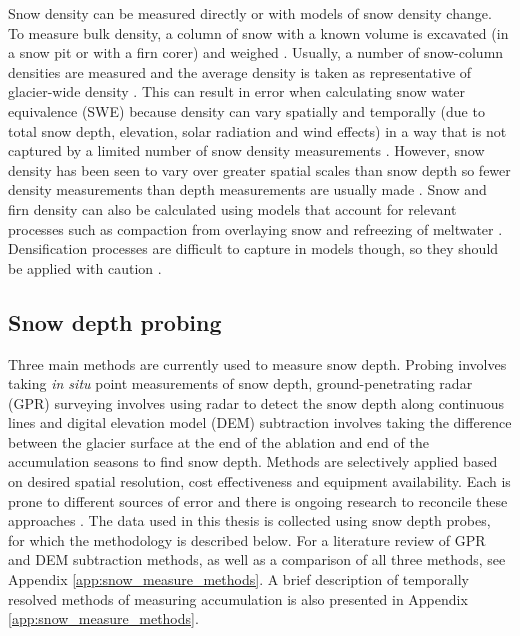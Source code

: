 \documentclass{sfuthesis}
\begin{document}
Snow density can be measured directly or with models of snow density change. To measure bulk density, a column of snow with a known volume is excavated (in a snow pit or with a firn corer) and weighed \citep{Sold2013, Sold2014}. Usually, a number of snow-column densities are measured and the average density is taken as representative of glacier-wide density \citep[e.g.][]{Machguth2006, Grunewald2010, McGrath2015}. This can result in error when calculating snow water equivalence (SWE) because density can vary spatially and temporally (due to total snow depth, elevation, solar radiation and wind effects) in a way that is not captured by a limited number of snow density measurements \citep{Grunewald2010, Wetlaufer2016}. However, snow density has been seen to vary over greater spatial scales than snow depth so fewer density measurements than depth measurements are usually made \citep{Elder1998, Clark2011}. Snow and firn density can also be calculated using models that account for relevant processes such as compaction from overlaying snow and refreezing of meltwater \citep{Herron1980, Sold2014}. Densification processes are difficult to capture in models though, so they should be applied with caution \citep{Mellor1974}.

\subsection{Snow depth probing}

Three main methods are currently used to measure snow depth. Probing involves taking \textit{in situ} point measurements of snow depth, ground-penetrating radar (GPR) surveying involves using radar to detect the snow depth along continuous lines and digital elevation model (DEM) subtraction involves taking the difference between the glacier surface at the end of the ablation and end of the accumulation seasons to find snow depth. Methods are selectively applied based on desired spatial resolution, cost effectiveness and equipment availability. Each is prone to different sources of error and there is ongoing research to reconcile these approaches \citep{Sold2014}. The data used in this thesis is collected using snow depth probes, for which the methodology is described below. For a literature review of GPR and DEM subtraction methods, as well as a comparison of all three methods, see Appendix \ref{app:snow_measure_methods}. A brief description of temporally resolved methods of measuring accumulation is also presented in Appendix \ref{app:snow_measure_methods}.
\end{document}
